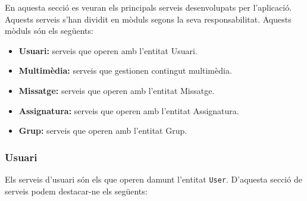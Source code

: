 		En aquesta secció es veuran els principals serveis desenvolupats per l'aplicació. Aquests serveis s'han dividit en mòduls segons la seva responsabilitat. Aquests mòduls són els següents:
		
		\begin{itemize}
			\item \textbf{Usuari:} serveis que operen amb l'entitat Usuari.
			\item \textbf{Multimèdia:} serveis que gestionen contingut multimèdia.
			\item \textbf{Missatge:} serveis que operen amb l'entitat Missatge.
			\item \textbf{Assignatura:} serveis que operen amb l'entitat Assignatura.
			\item \textbf{Grup:} serveis que operen amb l'entitat Grup.
		\end{itemize}
		
	\subsubsection{Usuari}
			
		Els serveis d'usuari són els que operen damunt l'entitat \texttt{User}. D'aquesta secció de serveis podem destacar-ne els següents:
		
